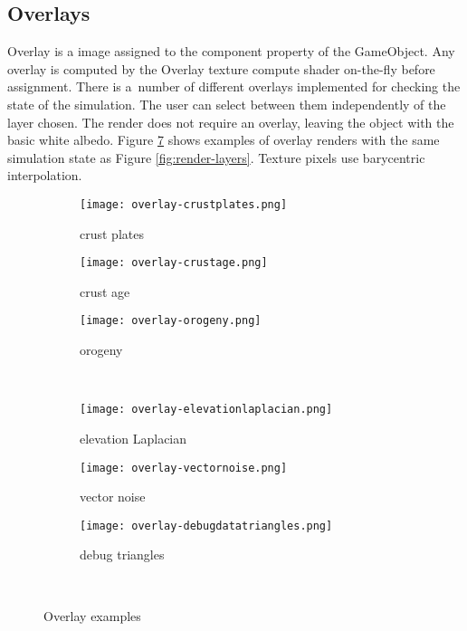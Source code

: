 \subsection{Overlays}
\label{subsec:overlays}
Overlay is a  image assigned to the  component  property of the  GameObject. Any overlay is computed by the Overlay texture compute shader on-the-fly before assignment. There is a~number of different overlays implemented for checking the state of the simulation. The user can select between them independently of the layer chosen. The render does not require an overlay, leaving the object with the basic white albedo. Figure \ref{fig:overlay-render} shows examples of overlay renders with the same simulation state as Figure \ref{fig:render-layers}. Texture pixels use barycentric interpolation.
\begin{figure}[ht]
\centering
\begin{subfigure}{4cm}
\texttt{[image: overlay-crustplates.png]}
\caption{crust plates}
\label{fig:overlay-crustplates}
\end{subfigure}
\hspace*{1cm}
\begin{subfigure}{4cm}
\texttt{[image: overlay-crustage.png]}
\caption{crust age}
\label{fig:overlay-crustage}
\end{subfigure}
\hspace*{1cm}
\begin{subfigure}{4cm}
\texttt{[image: overlay-orogeny.png]}
\caption{orogeny}
\label{fig:overlay-orogeny}
\end{subfigure}\\
\begin{subfigure}{4cm}
\texttt{[image: overlay-elevationlaplacian.png]}
\caption{elevation Laplacian}
\label{fig:overlay-elevationlaplacian}
\end{subfigure}
\hspace*{1cm}
\begin{subfigure}{4cm}
\texttt{[image: overlay-vectornoise.png]}
\caption{vector noise}
\label{fig:overlay-vectornoise}
\end{subfigure}
\hspace*{1cm}
\begin{subfigure}{4cm}
\texttt{[image: overlay-debugdatatriangles.png]}
\caption{debug triangles}
\label{fig:overlay-debugtriangles}
\end{subfigure}\\
\caption{Overlay examples}
\label{fig:overlay-render}
\end{figure}
